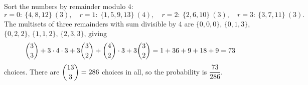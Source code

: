 Sort the numbers by remainder modulo $4$:
\[r=0:\ \{4,8,12\}\ (3),\quad r=1:\ \{1,5,9,13\}\ (4),\quad r=2:\ \{2,6,10\}\ (3),\quad r=3:\ \{3,7,11\}\ (3).\]
The multisets of three remainders with sum divisible by $4$ are $\{0,0,0\}$, $\{0,1,3\}$, $\{0,2,2\}$, $\{1,1,2\}$, $\{2,3,3\}$, giving
\[\dbinom33+3\cdot4\cdot3+3\dbinom32+\dbinom42\cdot3+3\dbinom32=1+36+9+18+9=73\]
choices. There are $\dbinom{13}{3}=286$ choices in all, so the probability is $\boxed{\dfrac{73}{286}}$.
